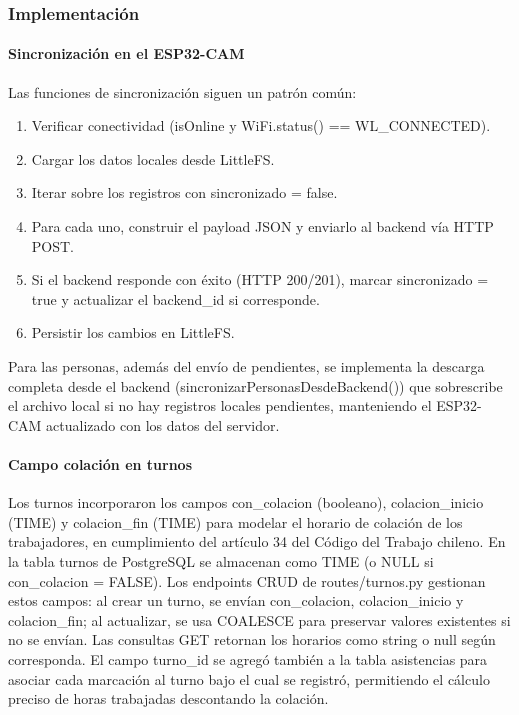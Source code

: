 \subsubsection{Implementación}

\paragraph{Sincronización en el ESP32-CAM}

Las funciones de sincronización siguen un patrón común:

\begin{enumerate}
    \item Verificar conectividad (isOnline y WiFi.status() == WL\_CONNECTED).
    \item Cargar los datos locales desde LittleFS.
    \item Iterar sobre los registros con sincronizado = false.
    \item Para cada uno, construir el payload JSON y enviarlo al backend vía HTTP POST.
    \item Si el backend responde con éxito (HTTP 200/201), marcar sincronizado = true y actualizar el backend\_id si corresponde.
    \item Persistir los cambios en LittleFS.
\end{enumerate}

Para las personas, además del envío de pendientes, se implementa la descarga completa desde el backend (sincronizarPersonasDesdeBackend()) que sobrescribe el archivo local si no hay registros locales pendientes, manteniendo el ESP32-CAM actualizado con los datos del servidor.

\paragraph{Campo colación en turnos}

Los turnos incorporaron los campos con\_colacion (booleano), colacion\_inicio (TIME) y colacion\_fin (TIME) para modelar el horario de colación de los trabajadores, en cumplimiento del artículo 34 del Código del Trabajo chileno. En la tabla turnos de PostgreSQL se almacenan como TIME (o NULL si con\_colacion = FALSE). Los endpoints CRUD de routes/turnos.py gestionan estos campos: al crear un turno, se envían con\_colacion, colacion\_inicio y colacion\_fin; al actualizar, se usa COALESCE para preservar valores existentes si no se envían. Las consultas GET retornan los horarios como string o null según corresponda. El campo turno\_id se agregó también a la tabla asistencias para asociar cada marcación al turno bajo el cual se registró, permitiendo el cálculo preciso de horas trabajadas descontando la colación.

